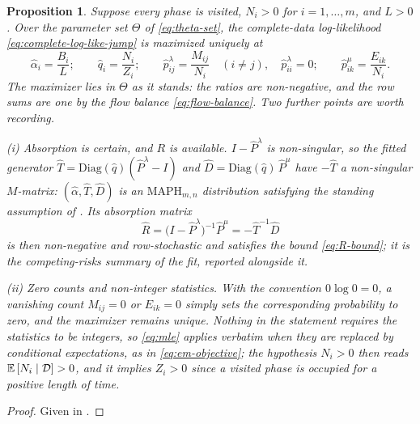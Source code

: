 \documentclass{article}
\newtheorem{proposition}{Proposition}
\newcommand{\ex}[1]{\mathbb{E}\left[#1\right]}
\newenvironment{subrevision}{}{}
\begin{document}
\begin{subrevision}
\begin{proposition}
\label{prop:approx-mle}
Suppose every phase is visited, $N_i>0$ for $i=1,\ldots,m$, and $L>0$. Over the parameter set
$\Theta$ of \eqref{eq:theta-set}, the complete-data log-likelihood
\eqref{eq:complete-log-like-jump} is maximized uniquely at
%
\begin{equation}\label{eq:mle}
\hat{\alpha}_{i}=\frac{B_i}{L}; \qquad
\hat{q}_{i}=\frac{N_{i}}{Z_{i}}; \qquad
\hat{p}^{\lambda}_{ij}=\frac{M_{ij}}{N_{i}} \quad (i \neq j), \quad \hat p^\lambda_{ii}=0; \qquad
\hat{p}^{\mu}_{ik}=\frac{E_{ik}}{N_{i}}.
\end{equation}
%
The maximizer lies in $\Theta$ as it stands: the ratios are non-negative, and the row sums are one by
the flow balance \eqref{eq:flow-balance}. Two further points are worth recording.

\noindent \textup{(i)} \emph{Absorption is certain, and $R$ is available.} $I-\widehat P^\lambda$ is
non-singular, so the fitted generator
$\widehat T = \mathrm{Diag}(\hat q)(\widehat P^\lambda - I)$ and
$\widehat D = \mathrm{Diag}(\hat q)\,\widehat P^\mu$ have $-\widehat T$ a non-singular $M$-matrix:
$(\hat\alpha,\widehat T,\widehat D)$ is an $\text{MAPH}_{m,n}$ distribution satisfying the standing
assumption of . Its absorption matrix
%
\begin{equation}
\label{eq:R-from-mle}
\widehat R = \big(I-\widehat P^\lambda\big)^{-1}\widehat P^\mu = -\widehat T^{-1}\widehat D
\end{equation}
%
is then non-negative and row-stochastic and satisfies the bound \eqref{eq:R-bound}; it is the
competing-risks summary of the fit, reported alongside it.

\noindent \textup{(ii)} \emph{Zero counts and non-integer statistics.} With the convention
$0\log0=0$, a vanishing count $M_{ij}=0$ or $E_{ik}=0$ simply sets the corresponding probability to
zero, and the maximizer remains unique. Nothing in the statement requires the statistics to be
integers, so \eqref{eq:mle} applies verbatim when they are replaced by conditional expectations, as
in \eqref{eq:em-objective}; the hypothesis $N_i>0$ then reads $\ex{N_i \mid {\cal D}}>0$, and it
implies $Z_i>0$ since a visited phase is occupied for a positive length of time.
\end{proposition}

\begin{proof}
Given in .
\end{proof}


\end{subrevision}
\end{document}
